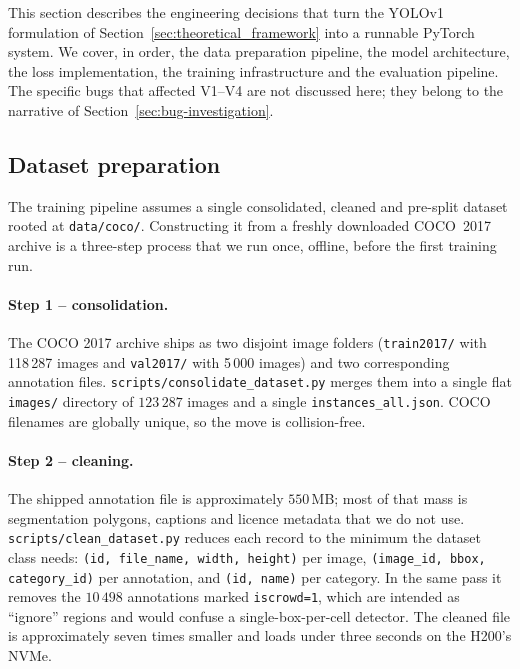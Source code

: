 
This section describes the engineering decisions that turn the YOLOv1
formulation of Section~\ref{sec:theoretical_framework} into a runnable PyTorch system. We cover, in order,
the data preparation pipeline, the model architecture, the loss
implementation, the training infrastructure and the evaluation pipeline. The
specific bugs that affected V1--V4 are not discussed here; they belong to the
narrative of Section~\ref{sec:bug-investigation}.

\subsection{Dataset preparation}
\label{sec:impl:dataset}

The training pipeline assumes a single consolidated, cleaned and pre-split
dataset rooted at \texttt{data/coco/}. Constructing it from a freshly
downloaded COCO~2017 archive is a three-step process that we run once,
offline, before the first training run.

\paragraph{Step 1 -- consolidation.} The COCO 2017 archive ships as two
disjoint image folders (\texttt{train2017/} with 118\,287 images and
\texttt{val2017/} with 5\,000 images) and two corresponding annotation files.
\texttt{scripts/consolidate\_dataset.py} merges them into a single flat
\texttt{images/} directory of $123\,287$ images and a single
\texttt{instances\_all.json}. COCO filenames are globally unique, so the move
is collision-free.

\paragraph{Step 2 -- cleaning.} The shipped annotation file is approximately
$550$\,MB; most of that mass is segmentation polygons, captions and licence
metadata that we do not use. \texttt{scripts/clean\_dataset.py} reduces each
record to the minimum the dataset class needs: \texttt{(id, file\_name, width,
height)} per image, \texttt{(image\_id, bbox, category\_id)} per annotation,
and \texttt{(id, name)} per category. In the same pass it removes the
$10\,498$ annotations marked \texttt{iscrowd=1}, which are intended as
``ignore'' regions and would confuse a single-box-per-cell detector. The
cleaned file is approximately seven times smaller and loads under three
seconds on the H200's NVMe.

